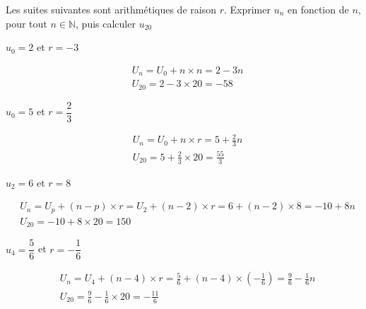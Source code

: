 \documentclass[12pt,a4paper]{article}  %
\begin{document}
Les suites suivantes sont arithmétiques de raison $r$. Exprimer $u_n$ en fonction de $n$, pour tout $n \in \mathbb{N}$, puis calculer $u_{20}$
	\begin{enumMet}
		\item $u_0=2$ et $r=-3$
		\begin{corrBox}
			$$
			\begin{aligned}
				& U_n=U_0+n \times n=2-3 n \\
				& U_{20}=2-3 \times 20=-58
			\end{aligned}
			$$
		\end{corrBox}
		\item $u_0=5$ et $r=\dfrac{2}{3}$
		\begin{corrBox}
			$$
			\begin{aligned}
				& U_n=U_0+n \times r=5+\frac{2}{3} n \\
				& U_{20}=5+\frac{2}{3} \times 20=\frac{55}{3}
			\end{aligned}
			$$
		\end{corrBox}
		\item {} $u_2=6$ et $r=8$
		\begin{corrBox}
			$$
			\begin{aligned}
				& U_n=U_p+(n-p) \times r=U_2+(n-2) \times r =6+(n-2) \times 8 =-10+8 n\\
				& U_{20}=-10+8 \times 20=150
			\end{aligned}
			$$
		\end{corrBox}
		\item $u_4=\dfrac{5}{6}$ et $r=-\dfrac{1}{6}$
		\begin{corrBox}
			$$
			\begin{aligned}
				& U_n=U_4+(n-4) \times r=\frac{5}{6}+(n-4) \times\left(-\frac{1}{6}\right)=\frac{9}{6}-\frac{1}{6} n \\
				& U_{20}=\frac{9}{6}-\frac{1}{6} \times 20=-\frac{11}{6}
			\end{aligned}
			$$
		\end{corrBox}
	\end{enumMet}

\end{document}
